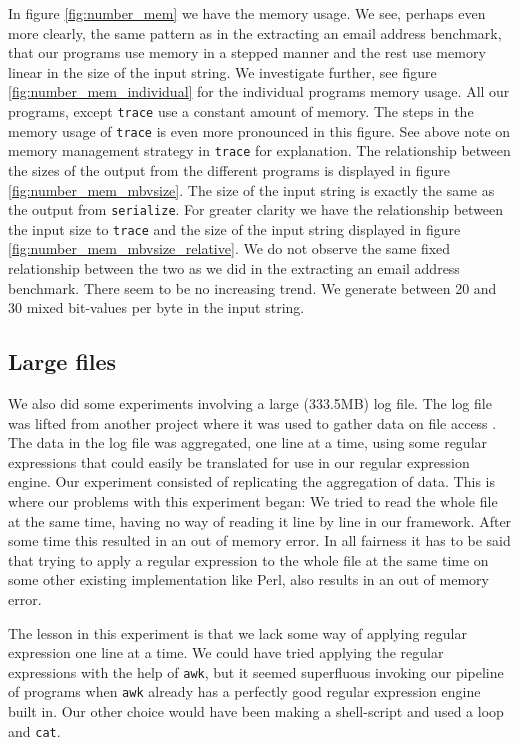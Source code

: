In figure \vref{fig:number_mem} we have the memory usage. We see,
perhaps even more clearly, the same pattern as in the extracting an
email address benchmark, that our programs use memory in a stepped
manner and the rest use memory linear in the size of the input
string. We investigate further, see figure
\vref{fig:number_mem_individual} for the individual programs memory
usage. All our programs, except \texttt{trace} use a constant amount
of memory. The steps in the memory usage of \texttt{trace} is even
more pronounced in this figure. See above note on memory management
strategy in \texttt{trace} for explanation. The relationship between
the sizes of the output from the different programs is displayed in
figure \vref{fig:number_mem_mbvsize}. The size of the input string is
exactly the same as the output from \texttt{serialize}. For greater
clarity we have the relationship between the input size to
\texttt{trace} and the size of the input string displayed in figure
\vref{fig:number_mem_mbvsize_relative}. We do not observe the same
fixed relationship between the two as we did in the extracting an
email address benchmark. There seem to be no increasing trend. We
generate between 20 and 30 mixed bit-values per byte in the input
string.


\subsection{Large files}

We also did some experiments involving a large (333.5MB) log file. The
log file was lifted from another project where it was used to gather
data on file access \cite{jan2010}. The data in the log file was
aggregated, one line at a time, using some regular expressions that
could easily be translated for use in our regular expression
engine. Our experiment consisted of replicating the aggregation of
data. This is where our problems with this experiment began: We tried
to read the whole file at the same time, having no way of reading it
line by line in our framework. After some time this resulted in an out
of memory error. In all fairness it has to be said that trying to
apply a regular expression to the whole file at the same time on some
other existing implementation like Perl, also results in an out of
memory error. 

The lesson in this experiment is that we lack some way of applying
regular expression one line at a time. We could have tried applying
the regular expressions with the help of \texttt{awk}, but it seemed
superfluous invoking our pipeline of programs when \texttt{awk}
already has a perfectly good regular expression engine built in. Our
other choice would have been making a shell-script and used a loop and
\texttt{cat}. 


